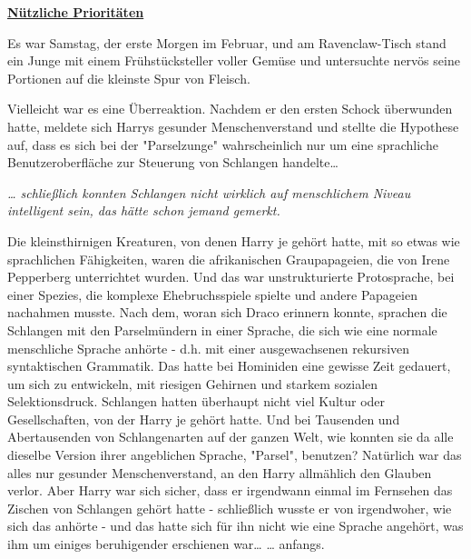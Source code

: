 

\hypertarget{nuxfctzliche-priorituxe4ten}{%

\textbf{\uline{Nützliche Prioritäten}}

Es war Samstag, der erste Morgen im Februar, und am Ravenclaw-Tisch stand ein Junge mit einem Frühstücksteller voller Gemüse und untersuchte nervös seine Portionen auf die kleinste Spur von Fleisch.

Vielleicht war es eine Überreaktion. Nachdem er den ersten Schock überwunden hatte, meldete sich Harrys gesunder Menschenverstand und stellte die Hypothese auf, dass es sich bei der "Parselzunge" wahrscheinlich nur um eine sprachliche Benutzeroberfläche zur Steuerung von Schlangen handelte…

\emph{… schließlich konnten Schlangen nicht wirklich auf menschlichem Niveau intelligent sein, das hätte schon jemand gemerkt.}

Die kleinsthirnigen Kreaturen, von denen Harry je gehört hatte, mit so etwas wie sprachlichen Fähigkeiten, waren die afrikanischen Graupapageien, die von Irene Pepperberg unterrichtet wurden. Und das war unstrukturierte Protosprache, bei einer Spezies, die komplexe Ehebruchsspiele spielte und andere Papageien nachahmen musste. Nach dem, woran sich Draco erinnern konnte, sprachen die Schlangen mit den Parselmündern in einer Sprache, die sich wie eine normale menschliche Sprache anhörte - d.h. mit einer ausgewachsenen rekursiven syntaktischen Grammatik. Das hatte bei Hominiden eine gewisse Zeit gedauert, um sich zu entwickeln, mit riesigen Gehirnen und starkem sozialen Selektionsdruck. Schlangen hatten überhaupt nicht viel Kultur oder Gesellschaften, von der Harry je gehört hatte. Und bei Tausenden und Abertausenden von Schlangenarten auf der ganzen Welt, wie konnten sie da alle dieselbe Version ihrer angeblichen Sprache, "Parsel", benutzen? Natürlich war das alles nur gesunder Menschenverstand, an den Harry allmählich den Glauben verlor. Aber Harry war sich sicher, dass er irgendwann einmal im Fernsehen das Zischen von Schlangen gehört hatte - schließlich wusste er von irgendwoher, wie sich das anhörte - und das hatte sich für ihn nicht wie eine Sprache angehört, was ihm um einiges beruhigender erschienen war… … anfangs.

}
